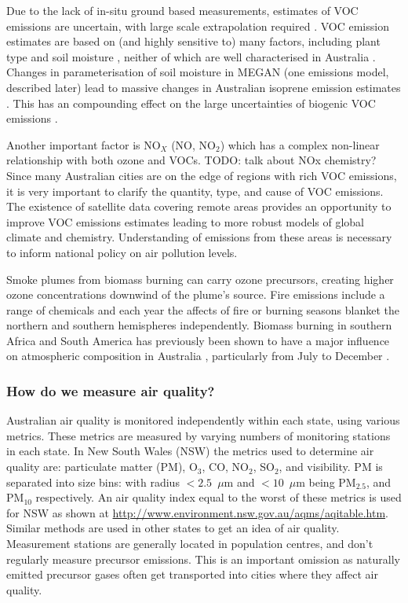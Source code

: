       Due to the lack of in-situ ground based measurements, estimates of VOC emissions are uncertain, with large scale extrapolation required \citet{Millet2006}.
      VOC emission estimates are based on (and highly sensitive to) many factors, including plant type and soil moisture \citep{Guenther1995}, neither of which are well characterised in Australia \citep{Sindelarova2014, Bauwens2016}.
      Changes in parameterisation of soil moisture in MEGAN (one emissions model, described later) lead to massive changes in Australian isoprene emission estimates \citep{Sindelarova2014}.
      This has an compounding effect on the large uncertainties of biogenic VOC emissions \citep{Guenther2000, Millet2006}.
      
      Another important factor is NO$_X$ (NO, NO$_2$) which has a complex non-linear relationship with both ozone and VOCs. TODO: talk about NOx chemistry?
      Since many Australian cities are on the edge of regions with rich VOC emissions, it is very important to clarify the quantity, type, and cause of VOC emissions.
      The existence of satellite data covering remote areas provides an opportunity to improve VOC emissions estimates leading to more robust models of global climate and chemistry.
      Understanding of emissions from these areas is necessary to inform national policy on air pollution levels.
      
      Smoke plumes from biomass burning can carry ozone precursors, creating higher ozone concentrations downwind of the plume's source.
      Fire emissions include a range of chemicals and each year the affects of fire or burning seasons blanket the northern and southern hemispheres independently.
      Biomass burning in southern Africa and South America has previously been shown to have a major influence on atmospheric composition in Australia \citep{Oltmans2001, Gloudemans2006, Edwards2006}, particularly from July to December \citep{Pak2003, Liu2016}.
    
    \subsubsection{How do we measure air quality?}
    
      Australian air quality is monitored independently within each state, using various metrics. These metrics are measured by varying numbers of monitoring stations in each state.
      In New South Wales (NSW) the metrics used to determine air quality are: particulate matter (PM), O$_3$, CO, NO$_2$, SO$_2$, and visibility.
      PM is separated into size bins: with radius $< 2.5 $~$\mu$m and $<10$~$\mu$m being PM$_{2.5}$, and PM$_{10}$ respectively.
      An air quality index equal to the worst of these metrics is used for NSW as shown at \url{http://www.environment.nsw.gov.au/aqms/aqitable.htm}.
      Similar methods are used in other states to get an idea of air quality.
      Measurement stations are generally located in population centres, and don't regularly measure precursor emissions. 
      This is an important omission as naturally emitted precursor gases often get transported into cities where they affect air quality.
      

